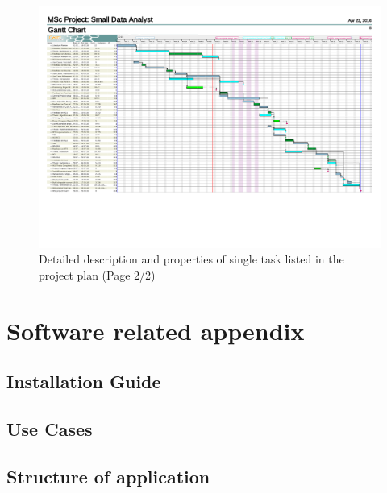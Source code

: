 \begin{figure}
	\centering
	\includegraphics[page=3,width=\textwidth]{appendix/Projectplan.pdf}
	\caption{Detailed description and properties of single task listed in the project plan (Page 2/2)}
	\label{fig:projectplan:details:2}
\end{figure}


\section{Software related appendix}
\subsection{Installation Guide}
\label{app:installation}

\subsection{Use Cases}
\label{app:use_cases}

\subsection{Structure of application}
\label{app:structure}
